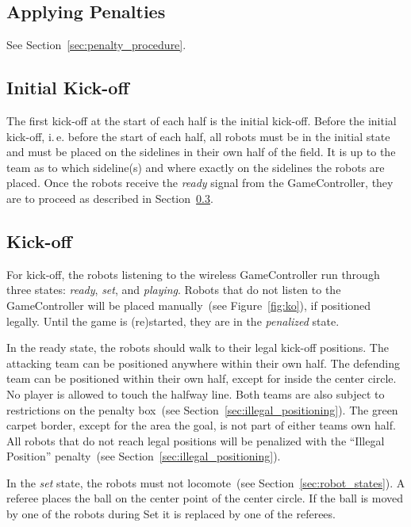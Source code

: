 \documentclass[12pt]{article}
\newcommand{\ie}{\mbox{i.\,e.}\xspace}
\newcommand{\cf}{see\xspace}
\begin{document}
\subsection{Applying Penalties}

See Section~\ref{sec:penalty_procedure}.


\subsection{Initial Kick-off}
\label{sec:initial-kick-off}

The first kick-off at the start of each half is the initial kick-off.
Before the initial kick-off, \ie before the start of each half, all robots must be in the initial state and must be placed on the sidelines in their own half of the field.
It is up to the team as to which sideline(s) and where exactly on the sidelines the robots are placed.
Once the robots receive the \emph{ready} signal from the GameController, they are to proceed as described in Section~\ref{sec:kick-off}.


\subsection{Kick-off}
\label{sec:kick-off}
For kick-off, the robots listening to the wireless GameController run through three states: \emph{ready}, \emph{set}, and \emph{playing}.
Robots that do not listen to the GameController will be placed manually~(see Figure~\ref{fig:ko}), if positioned legally.
Until the game is (re)started, they are in the \emph{penalized} state.

In the ready state, the robots should walk to their legal kick-off positions.
The attacking team can be positioned anywhere within their own half.
The defending team can be positioned within their own half, except for inside the center circle.
No player is allowed to touch the halfway line.
Both teams are also subject to restrictions on the penalty box~(\cf Section~\ref{sec:illegal_positioning}).
The green carpet border, except for the area the goal, is not part of either teams own half. All robots that do not reach legal positions will be penalized with the ``Illegal Position'' penalty~(\cf Section~\ref{sec:illegal_positioning}).


In the \emph{set} state, the robots must not locomote~(\cf Section~\ref{sec:robot_states}). A referee places the ball on the center point of the center circle. If the ball is moved by one of the robots during Set it is replaced by one of the referees.
\end{document}
